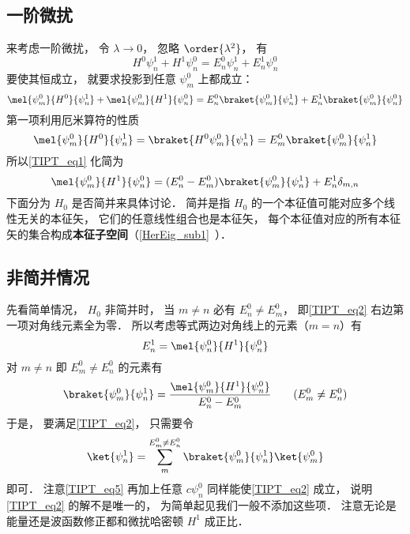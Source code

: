 \subsection{一阶微扰}
来考虑一阶微扰， 令 $\lambda \to 0$， 忽略 $\order{\lambda^2}$， 有
\begin{equation}
H^0\psi_n^1 + H^1 \psi_n^0 = E_n^0 \psi_n^1 + E_n^1 \psi_n^0
\end{equation}
要使其恒成立， 就要求投影到任意 $\psi_m^0$ 上都成立：
\begin{equation}\label{TIPT_eq1}
\mel{\psi_m^0}{H^0}{\psi_n^1} + \mel{\psi_m^0}{H^1}{\psi_n^0} = E_n^0 \braket{\psi_m^0}{\psi_n^1} + E_n^1 \braket{\psi_m^0}{\psi_n^0}
\end{equation}
第一项利用厄米算符的性质
\begin{equation}
\mel{\psi_m^0}{H^0}{\psi_n^1} = \braket{H^0\psi_m^0}{\psi_n^1} = E_m^0\braket{\psi_m^0}{\psi_n^1}
\end{equation}
所以\autoref{TIPT_eq1} 化简为
\begin{equation}\label{TIPT_eq2}
\mel{\psi_m^0}{H^1}{\psi_n^0} = (E_n^0 - E_m^0) \braket{\psi_m^0}{\psi_n^1} + E_n^1 \delta_{m,n}
\end{equation}
下面分为 $H_0$ 是否简并来具体讨论． 简并是指 $H_0$ 的一个本征值可能对应多个线性无关的本征矢， 它们的任意线性组合也是本征矢， 每个本征值对应的所有本征矢的集合构成\textbf{本征子空间}（\autoref{HerEig_sub1}~）．

\subsection{非简并情况}
先看简单情况， $H_0$ 非简并时， 当 $m\ne n$ 必有 $E_n^0 \ne E_m^0$， 即\autoref{TIPT_eq2} 右边第一项对角线元素全为零． 所以考虑等式两边对角线上的元素（$m = n$）有
\begin{equation}\label{TIPT_eq6}
E_n^1 = \mel{\psi_n^0}{H^1}{\psi_n^0}
\end{equation}
对 $m \ne n$ 即 $E_m^0 \ne E_n^0$ 的元素有
\begin{equation}\label{TIPT_eq4}
\braket{\psi_m^0}{\psi_n^1} = \frac{\mel{\psi_m^0}{H^1}{\psi_n^0}}{E_n^0 - E_m^0} \qquad (E_m^0 \ne E_n^0)
\end{equation}
于是， 要满足\autoref{TIPT_eq2}， 只需要令
\begin{equation}\label{TIPT_eq5}
\ket{\psi_n^1} = \sum_m^{E_m^0 \ne E_n^0} \braket{\psi_m^0}{\psi_n^1} \ket{\psi_m^0}
\end{equation}
即可． 注意\autoref{TIPT_eq5} 再加上任意 $c \psi_n^0$ 同样能使\autoref{TIPT_eq2} 成立， 说明\autoref{TIPT_eq2} 的解不是唯一的， 为简单起见我们一般不添加这些项． 注意无论是能量还是波函数修正都和微扰哈密顿 $H^1$ 成正比．

